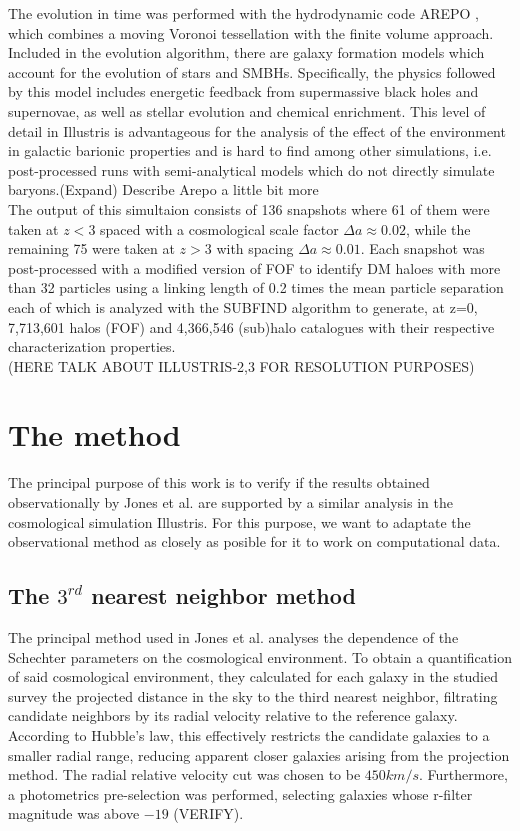 \documentclass[a4paper,fleqn,usenatbib]{mnras}
\begin{document}
The evolution in time was performed with the hydrodynamic code AREPO \cite{arepo}, which combines a moving Voronoi tessellation with the finite volume approach. Included in the evolution algorithm, there are galaxy formation models which account for the evolution of stars and SMBHs. Specifically, the physics followed by this model includes energetic feedback from supermassive black holes and supernovae, as well as stellar evolution and chemical enrichment. This level of detail in Illustris is advantageous for the analysis of the effect of the environment  in galactic barionic properties and is hard to find among other simulations, i.e. post-processed runs with semi-analytical models which do not directly simulate baryons.(Expand) Describe Arepo a little bit more\\

The output of this simultaion consists of 136 snapshots where 61 of them were taken at $z < 3$ spaced with a cosmological scale factor $\Delta a \approx 0.02$, while the remaining 75 were taken at $z > 3$ with spacing $\Delta a \approx 0.01$. Each snapshot was post-processed with a modified version of FOF \cite{FOF} to identify DM haloes with more than 32 particles using a linking length of 0.2 times the mean particle separation each of which is analyzed with the SUBFIND algorithm \cite{subfind} to generate, at z=0, 7,713,601 halos (FOF) and 4,366,546 (sub)halo catalogues with their respective characterization properties. \\

(HERE TALK ABOUT ILLUSTRIS-2,3 FOR RESOLUTION PURPOSES)

\section{The method}

The principal purpose of this work is to verify if the results obtained observationally by Jones et al. \cite{jones1} are supported by a similar analysis in the cosmological simulation Illustris. For this purpose, we want to adaptate the observational method as closely as posible for it to work on computational data.\\

\subsection{The $3^{rd}$ nearest neighbor method}

The principal method used in Jones et al. \cite{jones1} analyses the
dependence of the Schechter parameters on the cosmological
environment. To obtain a quantification of said cosmological
environment, they calculated for each galaxy in the studied survey the
projected distance in the sky to the third nearest neighbor,
filtrating candidate neighbors by its radial velocity relative to the
reference galaxy. According to Hubble's law, this effectively
restricts the candidate galaxies to a smaller radial range, reducing
apparent closer galaxies arising from the projection method. The
radial relative velocity cut was chosen to be $450km/s$. Furthermore,
a photometrics pre-selection was performed, selecting galaxies whose
r-filter magnitude was above $-19$ (VERIFY).\\  
\end{document}
